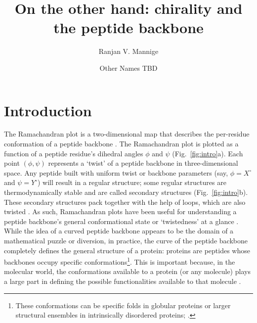 \documentclass[fleqn,10pt]{wlpeerj} %
\title{On the other hand: chirality and the peptide backbone}
\author[1,*]{Ranjan V. Mannige}
\author[1]{Other Names TBD}
\affil[1]{~Molecular Foundry, Lawrence Berkeley National Laboratory, 1 Cyclotron Road, Berkeley, CA, U.S.A.}
\affil[*]{~rvmannige@lbl.gov}
\newcommand{\Fig}[1]{Fig.~\ref{#1}}
\begin{document}
\flushbottom
\maketitle
\thispagestyle{empty}

\section*{Introduction}


The Ramachandran plot \citep{Ramachandran1963} is a two-dimensional map that describes the per-residue conformation of a peptide backbone \citep{Berg2006,Alberts2002,Ho2003}. The Ramachandran plot is plotted as a function of a peptide residue's dihedral angles $\phi$ and $\psi$ (\Fig{fig:intro}a). Each point $(\phi,\psi)$ represents a `twist' of a peptide backbone in three-dimensional space. Any peptide built with uniform twist or backbone parameters (say, $\phi=X^\circ$ and $\psi=Y^\circ$) will result in a regular structure; some regular structures are thermodynamically stable and are called secondary structures (\Fig{fig:intro}b). These secondary structures pack together with the help of loops, which are also twisted \citep{Berg2006}. As such, Ramachandran plots have been useful for understanding a peptide backbone's general conformational state or `twistedness' at a glance \citep{Ho2003,Berg2006,Alberts2002,Subramanian2001,Laskowski1993,Hooft1997,Laskowski2003}. While the idea of a curved peptide backbone appears to be the domain of a mathematical puzzle or diversion, in practice, the curve of the peptide backbone completely defines the general structure of a protein: proteins are peptides whose backbones occupy specific conformations\footnote{These conformations can be specific folds in globular proteins or larger structural ensembles in intrinsically disordered proteins; \cite{Mannige2014b}.}. This is important because, in the molecular world, the conformations available to a protein (or any molecule) plays a large part in defining the possible functionalities available to that molecule \citep{Berg2006,Alberts2002}.
\end{document}
